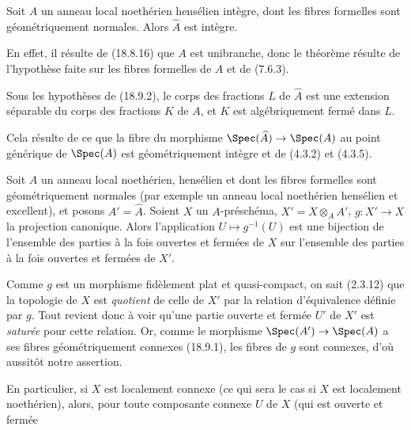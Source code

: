 \begin{corollary}[18.9.2]
\label{IV.18.9.2}
Soit $A$ un anneau local noethérien hensélien intègre, dont les fibres formelles sont géométriquement normales. Alors $\widehat A$ est intègre.
\end{corollary}

En effet, il résulte de (18.8.16) que $A$ est unibranche, donc le théorème résulte de l'hypothèse faite sur les fibres formelles de $A$ et de (7.6.3).

\begin{corollary}[18.9.3]
\label{IV.18.9.3}
Sous les hypothèses de (18.9.2), le corps des fractions $L$ de $\widehat A$ est une extension séparable du corps des fractions $K$ de $A$, et $K$ est algébriquement fermé dans $L$.
\end{corollary}

Cela résulte de ce que la fibre du morphisme $\Spec(\widehat A)\to\Spec(A)$ au point générique de $\Spec(A)$ est géométriquement intègre et de (4.3.2) et (4.3.5).

\begin{corollary}[18.9.4]
\label{IV.18.9.4}
Soit $A$ un anneau local noethérien, hensélien et dont les fibres formelles sont géométriquement normales (par exemple un anneau local noethérien hensélien et excellent), et posons $A'=\widehat A$. Soient $X$ un $A$-préschéma, $X'=X\otimes_A A'$, $g:X'\to X$ la projection canonique. Alors l'application $U\mapsto g^{-1}(U)$ est une bijection de l'ensemble des parties à la fois ouvertes et fermées de $X$ sur l'ensemble des parties à la fois ouvertes et fermées de $X'$.
\end{corollary}

Comme $g$ est un morphisme fidèlement plat et quasi-compact, on sait (2.3.12) que la topologie de $X$ est \emph{quotient} de celle de $X'$ par la relation d'équivalence définie par $g$. Tout revient donc à voir qu'une partie ouverte et fermée $U'$ de $X'$ est \emph{saturée} pour cette relation. Or, comme le morphisme $\Spec(A')\to\Spec(A)$ a ses fibres géométriquement connexes (18.9.1), les fibres de $g$ sont connexes, d'où aussitôt notre assertion.

En particulier, si $X$ est localement connexe (ce qui sera le cas si $X$ est localement noethérien), alors, pour toute composante connexe $U$ de $X$ (qui est ouverte et fermée

